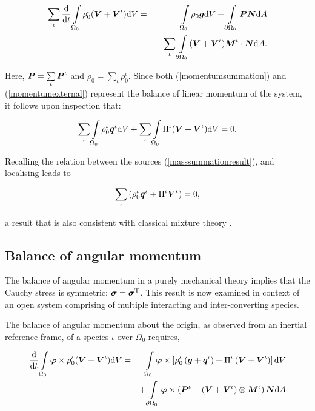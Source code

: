 \begin{eqnarray}
\sum\limits_{\iota}\frac{\mathrm{d}}{\mathrm{d}t}
\int\limits_{\Omega_0} \rho_0^\iota(\mbox{\boldmath$ V$}+\mbox{\boldmath$ V$}^\iota) \mathrm{d}V &=&
\int\limits_{\Omega_0}\rho_0\mbox{\boldmath$ g$} \mathrm{d}V +
\int\limits_{\partial \Omega_0}\mbox{\boldmath$ P$}\mbox{\boldmath$ N$} \mathrm{d}A \nonumber\\
& &- \sum\limits_{\iota}\int\limits_{\partial
\Omega_0}(\mbox{\boldmath$ V$}+\mbox{\boldmath$ V$}^\iota)\mbox{\boldmath$ M$}^\iota\cdot\mbox{\boldmath$ N$} \mathrm{d}A.
\label{momentumexternal}
\end{eqnarray}

\noindent Here, $\mbox{\boldmath$ P$} = \sum\limits_{\iota}\mbox{\boldmath$ P$}^\iota$ and $\rho_0 =
\sum\limits_{\iota}\rho_0^\iota$. Since both (\ref{momentumsummation})
and (\ref{momentumexternal}) represent the balance of linear momentum
of the system, it follows upon inspection that:

\begin{eqnarray}
\sum\limits_{\iota}\int\limits_{\Omega_0} \rho^\iota_0\mbox{\boldmath$ q$}^\iota
\mathrm{d}V + \sum\limits_{\iota}\int\limits_{\Omega_0}
\Pi^\iota(\mbox{\boldmath$ V$}+\mbox{\boldmath$ V$}^\iota) \mathrm{d}V = 0.
\end{eqnarray}

Recalling the relation between the sources
(\ref{masssummationresult}), and localising leads to

\begin{eqnarray}
\sum\limits_{\iota}\left(\rho^\iota_0\mbox{\boldmath$ q$}^\iota +
\Pi^\iota\mbox{\boldmath$ V$}^\iota\right)=0,
\label{momentumsummationresult}
\end{eqnarray}

\noindent a result that is also consistent with classical mixture
theory \citep{TruesdellNoll:65}.

\subsection{Balance of angular momentum}
\label{balance-of-angular-momentum}

The balance of angular momentum in a purely mechanical theory implies
that the Cauchy stress is symmetric: $\mbox{\boldmath$\sigma$} =
\mbox{\boldmath$\sigma$}^{\mathrm{T}}$. This result is now examined in context of an
open system comprising of multiple interacting and inter-converting
species.

The balance of angular momentum about the origin, as observed from an
inertial reference frame, of a species $\iota$ over $\Omega_{0}$
requires,

\begin{eqnarray}
\frac{\mathrm{d}}{\mathrm{d}t} \int\limits_{\Omega_0} \mbox{\boldmath$\varphi$}
\times \rho^\iota_0(\mbox{\boldmath$ V$}+\mbox{\boldmath$ V$}^\iota)\mathrm{d}V &=&
\int\limits_{\Omega_0}\mbox{\boldmath$\varphi$}\times\left
           [\rho^\iota_0\left(\mbox{\boldmath$ g$}+\mbox{\boldmath$ q$}^\iota\right) +
             \Pi^\iota\left(\mbox{\boldmath$ V$}+\mbox{\boldmath$ V$}^\iota\right)\right]\mathrm{d}V
           \nonumber\\  & &+
\int\limits_{\partial\Omega_0}\mbox{\boldmath$\varphi$}\times\left(\mbox{\boldmath$ P$}^\iota -
\left(\mbox{\boldmath$ V$}+\mbox{\boldmath$ V$}^\iota\right)\otimes\mbox{\boldmath$ M$}^\iota\right)\mbox{\boldmath$ N$}
\mathrm{d}A
\label{globalbalanceofangularmomentum}
\end{eqnarray}

